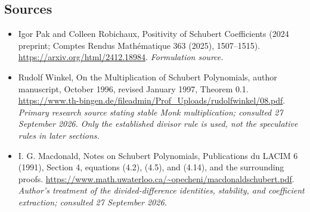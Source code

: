 \documentclass[11pt]{article}
\begin{document}
\subsection{Sources}
\begin{itemize}
\item[S1]Igor Pak and Colleen Robichaux, Positivity of Schubert Coefficients (2024 preprint; Comptes Rendus Mathématique 363 (2025), 1507–1515).
\url{https://arxiv.org/html/2412.18984}.
\textit{Formulation source.}
\item[E1]Rudolf Winkel, On the Multiplication of Schubert Polynomials,
author manuscript, October 1996, revised January 1997, Theorem 0.1.
\url{https://www.th-bingen.de/fileadmin/Prof_Uploads/rudolfwinkel/08.pdf}.
\textit{Primary research source stating stable Monk multiplication;
consulted 27 September 2026. Only the established divisor rule is used,
not the speculative rules in later sections.}
\item[E2]I. G. Macdonald, Notes on Schubert Polynomials,
Publications du LACIM 6 (1991), Section 4, equations (4.2), (4.5), and
(4.14), and the surrounding proofs.
\url{https://www.math.uwaterloo.ca/~opecheni/macdonaldschubert.pdf}.
\textit{Author's treatment of the divided-difference identities,
stability, and coefficient extraction; consulted 27 September 2026.}

\end{itemize}
\end{document}
